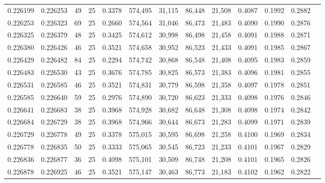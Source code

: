 \begin{tabular}{rrrrrrrrrrrrr}
0.226199 & 0.226253 &    49 &  25 &                                     0.3378 & 574,495 &  31,115 &  86,448 &  21,508 & 0.4087 & 0.1992 & 0.2882 \\
0.226253 & 0.226323 &    69 &  25 &                                     0.2660 & 574,564 &  31,046 &  86,473 &  21,483 & 0.4090 & 0.1990 & 0.2876 \\
0.226325 & 0.226379 &    48 &  25 &                                     0.3425 & 574,612 &  30,998 &  86,498 &  21,458 & 0.4091 & 0.1988 & 0.2871 \\
0.226380 & 0.226426 &    46 &  25 &                                     0.3521 & 574,658 &  30,952 &  86,523 &  21,433 & 0.4091 & 0.1985 & 0.2867 \\
0.226429 & 0.226482 &    84 &  25 &                                     0.2294 & 574,742 &  30,868 &  86,548 &  21,408 & 0.4095 & 0.1983 & 0.2859 \\
0.226483 & 0.226530 &    43 &  25 &                                     0.3676 & 574,785 &  30,825 &  86,573 &  21,383 & 0.4096 & 0.1981 & 0.2855 \\
0.226531 & 0.226585 &    46 &  25 &                                     0.3521 & 574,831 &  30,779 &  86,598 &  21,358 & 0.4097 & 0.1978 & 0.2851 \\
0.226585 & 0.226640 &    59 &  25 &                                     0.2976 & 574,890 &  30,720 &  86,623 &  21,333 & 0.4098 & 0.1976 & 0.2846 \\
0.226641 & 0.226683 &    38 &  25 &                                     0.3968 & 574,928 &  30,682 &  86,648 &  21,308 & 0.4098 & 0.1974 & 0.2842 \\
0.226684 & 0.226729 &    38 &  25 &                                     0.3968 & 574,966 &  30,644 &  86,673 &  21,283 & 0.4099 & 0.1971 & 0.2839 \\
0.226729 & 0.226778 &    49 &  25 &                                     0.3378 & 575,015 &  30,595 &  86,698 &  21,258 & 0.4100 & 0.1969 & 0.2834 \\
0.226778 & 0.226835 &    50 &  25 &                                     0.3333 & 575,065 &  30,545 &  86,723 &  21,233 & 0.4101 & 0.1967 & 0.2829 \\
0.226836 & 0.226877 &    36 &  25 &                                     0.4098 & 575,101 &  30,509 &  86,748 &  21,208 & 0.4101 & 0.1965 & 0.2826 \\
0.226878 & 0.226925 &    46 &  25 &                                     0.3521 & 575,147 &  30,463 &  86,773 &  21,183 & 0.4102 & 0.1962 & 0.2822 \\

\end{tabular}
